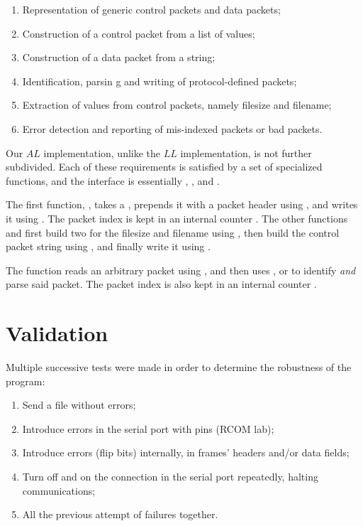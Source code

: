 \documentclass[main.tex]{subfiles}
\begin{document}
\begin{enumerate}[label=(\alph*),noitemsep,rightmargin=3em]
\item Representation of generic control packets and data packets;
\item Construction of a control packet from a list of values;
\item Construction of a data packet from a string;
\item Identification, parsin	g and writing of protocol-defined packets;
\item Extraction of  values from control packets, namely filesize and filename;
\item Error detection and reporting of mis-indexed \pDATA{} packets or bad packets.
\end{enumerate}

Our $AL$ implementation, unlike the $LL$ implementation, is not further subdivided.
Each of these requirements is satisfied by a set of specialized functions, and the interface is essentially , ,  and .

The first function, , takes a , prepends it with a packet header using , and writes it using .
The packet index is kept in an internal counter .
The other functions  and  first build two  for the filesize and filename using , then build the control packet string using , and finally write it using .

The  function reads an arbitrary packet using , and then uses ,  or  to identify \emph{and} parse said packet.
The packet index is also kept in an internal counter .

\section{Validation}
\label{sec:validation}

Multiple successive tests were made in order to determine the robustness of the program:

\begin{enumerate}[label=(\alph*),noitemsep,rightmargin=3em]
\item Send a file without errors;
\item Introduce errors in the serial port with pins (RCOM lab);
\item Introduce errors (flip bits) internally, in frames' headers and/or data fields;
\item Turn off and on the connection in the serial port repeatedly, halting communications;
\item All the previous attempt of failures together.
\end{enumerate}
\end{document}
